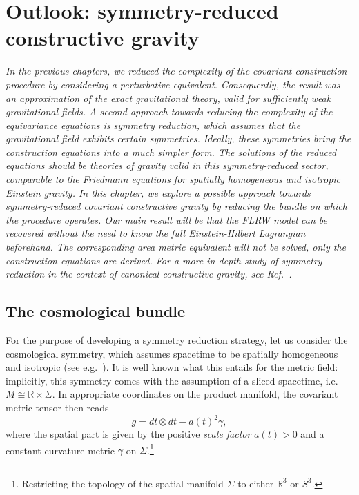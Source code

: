 \chapter{Outlook: symmetry-reduced constructive gravity}\label{chapter_cosmo}

\textit{In the previous chapters, we reduced the complexity of the covariant construction procedure by considering a perturbative equivalent. Consequently, the result was an approximation of the exact gravitational theory, valid for sufficiently weak gravitational fields. A second approach towards reducing the complexity of the equivariance equations is symmetry reduction, which assumes that the gravitational field exhibits certain symmetries. Ideally, these symmetries bring the construction equations into a much simpler form. The solutions of the reduced equations should be theories of gravity valid in this symmetry-reduced sector, comparable to the Friedmann equations for spatially homogeneous and isotropic Einstein gravity. In this chapter, we explore a possible approach towards symmetry-reduced covariant constructive gravity by reducing the bundle on which the procedure operates. Our main result will be that the FLRW model can be recovered without the need to know the full Einstein-Hilbert Lagrangian beforehand. The corresponding area metric equivalent will not be solved, only the construction equations are derived. For a more in-depth study of symmetry reduction in the context of canonical constructive gravity, see Ref.~\cite{Duell_2020}.}

\section{The cosmological bundle}
For the purpose of developing a symmetry reduction strategy, let us consider the cosmological symmetry, which assumes spacetime to be spatially homogeneous and isotropic (see e.g.~\cite{Weinberg_1972,Wald_1984}). It is well known what this entails for the metric field: implicitly, this symmetry comes with the assumption of a sliced spacetime, i.e.\ $M \cong \mathbb R \times \Sigma$. In appropriate coordinates on the product manifold, the covariant metric tensor then reads \cite{Weinberg_1972,Katanaev_2016}
\begin{equation}
  g = dt \otimes dt - a(t)^2 \gamma,
\end{equation}
where the spatial part is given by the positive \emph{scale factor} $a(t) > 0$ and a constant curvature metric $\gamma$ on $\Sigma$.\footnote{Restricting the topology of the spatial manifold $\Sigma$ to either $\mathbb R^3$ or $S^3$.}

